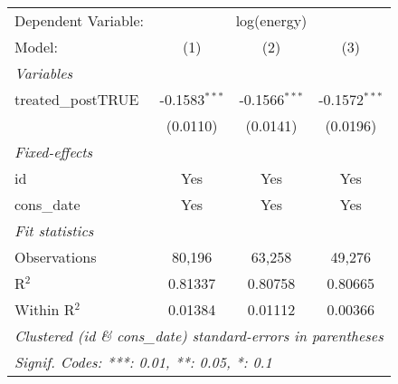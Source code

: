 
\begin{tabular}{lccc}
   \tabularnewline\midrule\midrule
   Dependent Variable: & \multicolumn{3}{c}{log(energy)}\\
   Model:             & (1)             & (2)             & (3)\\
   \midrule \emph{Variables} &   &   &  \\
   treated\_postTRUE & -0.1583$^{***}$ & -0.1566$^{***}$ & -0.1572$^{***}$\\
                      & (0.0110)        & (0.0141)        & (0.0196)\\
   \midrule \emph{Fixed-effects} &   &   &  \\
   id                 & Yes             & Yes             & Yes\\
   cons\_date        & Yes             & Yes             & Yes\\
   \midrule \emph{Fit statistics} &   &   &  \\
   Observations       & 80,196          & 63,258          & 49,276\\
   R$^2$              & 0.81337         & 0.80758         & 0.80665\\
   Within R$^2$       & 0.01384         & 0.01112         & 0.00366\\
   \midrule\midrule\multicolumn{4}{l}{\emph{Clustered (id \& cons\_date) standard-errors in parentheses}}\\
   \multicolumn{4}{l}{\emph{Signif. Codes: ***: 0.01, **: 0.05, *: 0.1}}\\
\end{tabular}


